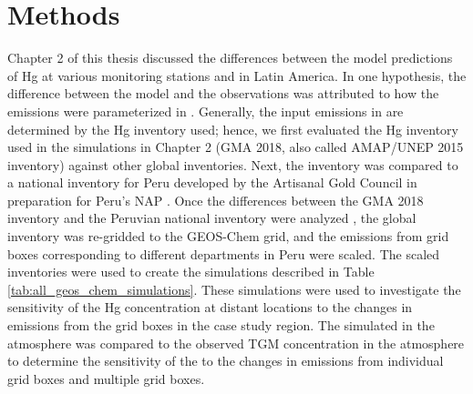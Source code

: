 \section{Methods}\label{c3_methods}
\begin{flushleft}
    Chapter 2 of this thesis discussed the differences between the \gc model predictions of Hg at various monitoring stations and in Latin America. In one hypothesis, the difference between the model and the observations was attributed to how the emissions were parameterized in \gc. Generally, the input emissions in \gc are determined by the Hg inventory used; hence, we first evaluated the Hg inventory used in the simulations in Chapter 2 (GMA 2018, also called AMAP/UNEP 2015 inventory) against other global inventories. Next, the inventory was compared to a national inventory for Peru developed by the Artisanal Gold Council in preparation for Peru's NAP \cite{agc_reporte_2017}. Once the differences between the GMA 2018 inventory\cite{steenhuisen_development_2019} and the Peruvian national inventory were analyzed \cite{agc_reporte_2017}, the global inventory was re-gridded to the GEOS-Chem grid, and the emissions from grid boxes corresponding to different departments in Peru were scaled. The scaled inventories were used to create the simulations described in Table \ref{tab:all_geos_chem_simulations}. These simulations were used to investigate the sensitivity of the Hg concentration at distant locations to the changes in emissions from the grid boxes in the case study region. The simulated \hgc in the atmosphere was compared to the observed TGM concentration in the atmosphere to determine the sensitivity of the \hgc to the changes in emissions from individual grid boxes and multiple grid boxes. 
\end{flushleft}

